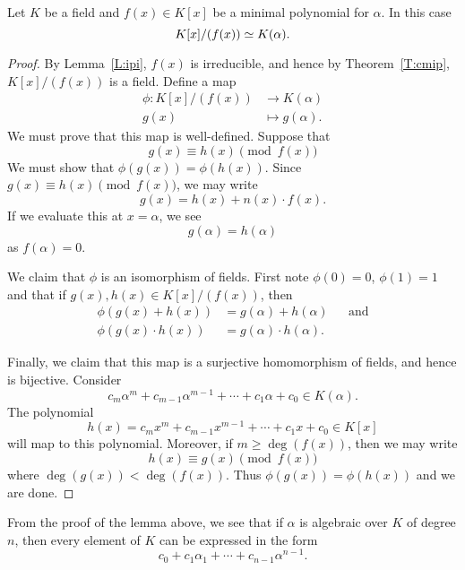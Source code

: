 \documentclass{ximera}
\begin{document}
\begin{lemma}
  Let $K$ be a field and $f(x)\in K[x]$ be a minimal polynomial for
  $\alpha$. In this case
  \[
  K[x]/(f(x))\simeq K(\alpha). 
  \]
  \begin{proof}
    By Lemma~\ref{L:ipi}, $f(x)$ is irreducible, and hence by
    Theorem~\ref{T:cmip}, $K[x]/(f(x))$ is a field. Define a map
    \begin{align*}
    \phi:K[x]/(f(x)) &\to K(\alpha)\\
    g(x) &\mapsto g(\alpha).
    \end{align*}
    We must prove that this map is well-defined.
    Suppose that
    \[
    g(x) \equiv h(x) \pmod{f(x)}
    \]
    We must show that $\phi(g(x)) = \phi(h(x))$. Since $g(x) \equiv
    h(x) \pmod{f(x)}$, we may write
    \[
    g(x) = h(x) + n(x) \cdot f(x).
    \]
    If we evaluate this at $x= \alpha$, we see
    \[
    g(\alpha) = h(\alpha)
    \]
    as $f(\alpha) = 0$.

    We claim that $\phi$ is an isomorphism of fields. First note
    $\phi(0) = 0$, $\phi(1) = 1$ and that if $g(x),h(x)\in
    K[x]/(f(x))$, then
    \begin{align*}
      \phi(g(x) + h(x)) &= g(\alpha) + h(\alpha) & &\text{and}\\
      \phi(g(x) \cdot h(x)) &= g(\alpha)\cdot h(\alpha). & &
    \end{align*}


    Finally, we claim that this map is a surjective homomorphism of
    fields, and hence is bijective. Consider
    \[
    c_m\alpha^m + c_{m-1}\alpha^{m-1} + \cdots + c_1\alpha + c_0\in
    K(\alpha).
    \]
    The polynomial
    \[
    h(x) = c_m x^m + c_{m-1} x^{m-1} + \cdots + c_1x  + c_0\in
    K[x]
    \]
    will map to this polynomial. Moreover, if $m\ge \deg(f(x))$, then
    we may write
    \[
    h(x) \equiv g(x) \pmod{f(x)}
    \]
    where $\deg(g(x))< \deg(f(x))$. Thus $\phi(g(x)) =\phi(h(x))$ and
    we are done.
  \end{proof}
\end{lemma}


\begin{remark}
From the proof of the lemma above, we see that if $\alpha$ is
algebraic over $K$ of degree $n$, then every element of $K$ can be
expressed in the form
\[
c_0 + c_1\alpha_1 + \cdots + c_{n-1}\alpha^{n-1}.
\]
\end{remark}
\end{document}
